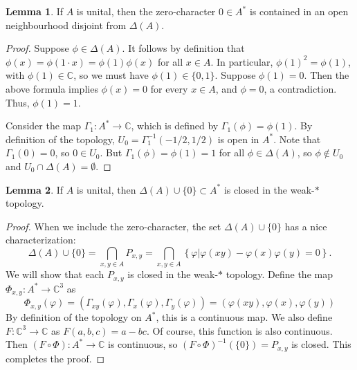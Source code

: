 \documentclass[aps,pra,showpacs,notitlepage,onecolumn,superscriptaddress,nofootinbib]{revtex4-1}
\theoremstyle{definition}
\newtheorem{lemma}{Lemma}[section]
\begin{document}
\begin{lemma}
  \label{lem:help}
  If $A$ is unital, then the zero-character $0 \in A^{*}$ is contained in an open neighbourhood disjoint from $\Delta(A)$.
\end{lemma}
\begin{proof}
  Suppose $\phi \in \Delta(A)$. It follows by definition that $\phi(x) = \phi(1 \cdot x) = \phi(1) \phi(x)$ for all $x \in A$. In particular,
  $\phi(1)^2 = \phi(1)$, with $\phi(1) \in \mathbb{C}$, so we must have $\phi(1) \in \{0, 1\}$. Suppose $\phi(1) = 0$. Then the above formula implies
  $\phi(x) = 0$ for every $x \in A$, and $\phi = 0$, a contradiction. Thus, $\phi(1) = 1$.

  Consider the map $\Gamma_1 : A^{*} \rightarrow \mathbb{C}$, which is defined by $\Gamma_1(\phi) = \phi(1)$. By definition of the topology, $U_0 = \Gamma_1^{-1}(-1/2, 1/2)$
  is open in $A^{*}$. Note that $\Gamma_1(0) = 0$, so $0 \in U_0$. But $\Gamma_1(\phi) = \phi(1) = 1$ for all $\phi \in \Delta(A)$, so $\phi \notin U_0$ and $U_0 \cap \Delta(A) = \emptyset$.
\end{proof}

\begin{lemma}
  If $A$ is unital, then $\Delta(A) \cup \{0\} \subset A^{*}$ is closed in the weak-$*$ topology.
\end{lemma}

\begin{proof}
  When we include the zero-character, the set $\Delta(A) \cup \{0\}$ has a nice characterization:
  \begin{equation}
    \Delta(A) \cup \{0\} = \displaystyle\bigcap_{x, y \in A} P_{x, y} = \displaystyle\bigcap_{x, y \in A} \left\{ \varphi \big| \varphi(xy) - \varphi(x) \varphi(y) = 0 \right\}.
  \end{equation}
  We will show that each $P_{x, y}$ is closed in the weak-$*$ topology. Define the map $\Phi_{x, y} : A^{*} \rightarrow \mathbb{C}^{3}$ as
  \begin{equation}
    \Phi_{x, y}(\varphi) = (\Gamma_{xy}(\varphi), \Gamma_{x}(\varphi), \Gamma_y(\varphi)) = (\varphi(xy), \varphi(x), \varphi(y))
  \end{equation}
  By definition of the topology on $A^{*}$, this is a continuous map. We also define $F : \mathbb{C}^{3} \rightarrow \mathbb{C}$ as
  $F(a, b, c) = a - bc$. Of course, this function is also continuous. Then $(F \circ \Phi) : A^{*} \rightarrow \mathbb{C}$ is continuous,
  so $(F \circ \Phi)^{-1}(\{0\}) = P_{x, y}$ is closed. This completes the proof.
\end{proof}
\end{document}
